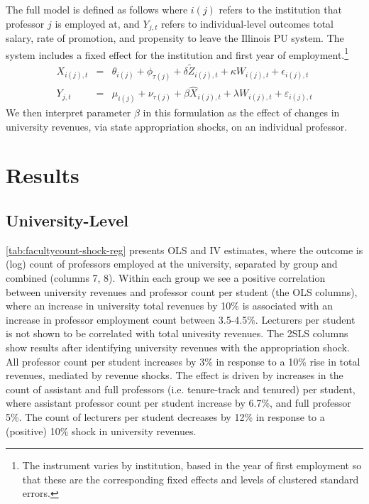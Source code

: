 \documentclass[notitlepage,12pt]{article}
\renewcommand{\tilde}[1]{\widetilde{#1}}                                   %
\begin{document}
The full model is defined as follows where $i(j)$ refers to the institution that professor $j$ is employed at, and $Y_{j,t}$ refers to individual-level outcomes total salary, rate of promotion, and propensity to leave the Illinois PU system.
The system includes a fixed effect for the institution and first year of employment.\footnote{
    The instrument varies by institution, based in the year of first employment so that these are the corresponding fixed effects and levels of clustered standard errors.
}
\begin{eqnarray}
    \label{eqn:secondstage1_indiv}
    X_{i(j),t} &=& \theta_{i(j)} + \phi_{\tau(j)} + \delta \tilde Z_{i(j),t} + \kappa W_{i(j),t} + \epsilon_{i(j),t} \\
    \label{eqn:secondstage2_indiv}
    Y_{j,t} &=& \mu_{i(j)} + \nu_{\tau(j)} + \beta \widehat X_{i(j),t} + \lambda W_{i(j),t} + \varepsilon_{i(j),t}
\end{eqnarray}
We then interpret parameter $\beta$ in this formulation as the effect of changes in university revenues, via state appropriation shocks, on an individual professor.


\section{Results}
\label{sec:results}

\subsection{University-Level}

\autoref{tab:facultycount-shock-reg} presents OLS and IV estimates, where the outcome is (log) count of professors employed at the university, separated by group and combined (columns 7, 8).
Within each group we see a positive correlation between university revenues and professor count per student (the OLS columns), where an increase in university total revenues by 10\% is associated with an increase in professor employment count between 3.5-4.5\%.
Lecturers per student is not shown to be correlated with total univesity revenues.
The 2SLS columns show results after identifying university revenues with the appropriation shock.
All professor count per student increases by 3\% in response to a 10\% rise in total revenues, mediated by revenue shocks.
The effect is driven by increases in the count of assistant and full professors (i.e. tenure-track and tenured) per student, where assistant professor count per student increase by 6.7\%, and full professor 5\%.
The count of lecturers per student decreases by 12\% in response to a (positive) 10\% shock in university revenues.
\end{document}
